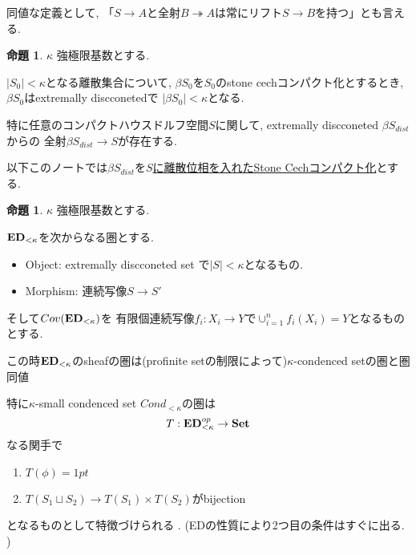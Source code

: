 \documentclass[dvipdfmx,a4paper,11pt]{article}
\theoremstyle{definition}
\newtheorem{prop}[thm]{命題}
\begin{document}
 同値な定義として, 「$S \to A$と全射$B \twoheadrightarrow A$は常にリフト$S \to B$を持つ」とも言える. 
 
   \begin{tcolorbox}
 [colback = white, colframe = green!35!black, fonttitle = \bfseries,breakable = true]
\begin{prop}\cite[Example 2.5]{Sch19}
\label{prop-sch-exa2.5}
$\kappa$ 強極限基数とする.

$|S_0| <\kappa$となる離散集合について, 
$\beta S_0$を$S_0$のstone cechコンパクト化とするとき,
 $\beta S_0$はextremally discconetedで
$|\beta S_0 | < \kappa$となる.

特に任意のコンパクトハウスドルフ空間$S$に関して, extremally discconeted $\beta S_{dist}$からの
全射$\beta S_{dist} \to S$が存在する. 

 \end{prop}
 \end{tcolorbox}
 
 以下このノートでは$\beta S_{dist}$を\underline{$S$に離散位相を入れたStone Cechコンパクト化}とする. 
 
   \begin{tcolorbox}
 [colback = white, colframe = green!35!black, fonttitle = \bfseries,breakable = true]
\begin{prop}\cite[Example 2.5]{Sch19}
$\kappa$ 強極限基数とする.

${\bf ED}_{< \kappa}$を次からなる圏とする.
\begin{itemize}
\item Object: extremally discconeted set で$|S| < \kappa$となるもの. 
\item Morphism: 連続写像$S \to S'$
\end{itemize}

そして$Cov({\bf ED}_{< \kappa})$を
有限個連続写像$f_i : X_i \to Y$で$\cup_{i=1}^{n}f_i(X_i) =Y$となるものとする. 

この時${\bf ED}_{< \kappa}$のsheafの圏は(profinite setの制限によって)$\kappa$-condenced setの圏と圏同値
 \end{prop}
 \end{tcolorbox}
 
特に$\kappa$-small condenced set $Cond_{<\kappa}$の圏は
$$
T : {\bf ED}_{< \kappa}^{op} \to {\bf Set}
$$
なる関手で
\begin{enumerate}
\item $T(\phi) = 1pt$
\item $T(S_1 \sqcup S_2) \to T(S_1) \times T(S_2)$がbijection
\end{enumerate}
となるものとして特徴づけられる .
(EDの性質により2つ目の条件はすぐに出る. )
\end{document}
